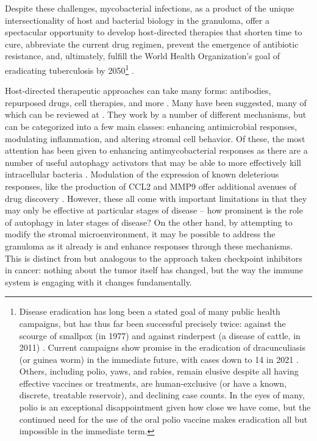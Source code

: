 Despite these challenges, mycobacterial infections, as a product of the unique intersectionality of host and bacterial biology in the granuloma, offer a spectacular opportunity to develop host\hyp{}directed therapies that shorten time to cure, abbreviate the current drug regimen, prevent the emergence of antibiotic resistance, and, ultimately, fulfill the World Health Organization's goal of eradicating tuberculosis by 2050\footnote{Disease eradication has long been a stated goal of many public health campaigns, but has thus far been successful precisely twice: against the scourge of smallpox (in 1977) and against rinderpest (a disease of cattle, in 2011) \citep{Hopkins2013, Mariner2012}. Current campaigns show promise in the eradication of dracunculiasis (or guinea worm) in the immediate future, with cases down to 14 in 2021 \citep{Kreier2022}. Others, including polio, yaws, and rabies, remain elusive despite all having effective vaccines or treatments, are human\hyp{}exclusive (or have a known, discrete, treatable reservoir), and declining case counts. In the eyes of many, polio is an exceptional disappointment given how close we have come, but the continued need for the use of the oral polio vaccine makes eradication all but impossible in the immediate term.} \citep{Schwegmann2008}. 

Host\hyp{}directed therapeutic approaches can take many forms: antibodies, repurposed drugs, cell therapies, and more \citep{Zumla2016}. Many have been suggested, many of which can be reviewed at \citet{Wallis2015}. They work by a number of different mechanisms, but can be categorized into a few main classes: enhancing antimicrobial responses, modulating inflammation, and altering stromal cell behavior. Of these, the most attention has been given to enhancing antimycobacterial responses as there are a number of useful autophagy activators that may be able to more effectively kill intracellular bacteria \citep{Wallis2015}. Modulation of the expression of known deleterious responses, like the production of CCL2 and MMP9 offer additional avenues of drug discovery \citep{Volkman2010, Cambier2014b}. However, these all come with important limitations in that they may only be effective at particular stages of disease -- how prominent is the role of autophagy in later stages of disease? On the other hand, by attempting to modify the stromal microenvironment, it may be possible to address the granuloma as it already is and enhance responses through these mechanisms. This is distinct from but analogous to the approach taken checkpoint inhibitors in cancer: nothing about the tumor itself has changed, but the way the immune system is engaging with it changes fundamentally. 

